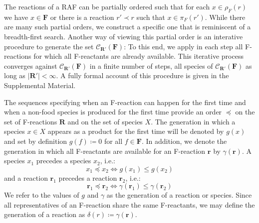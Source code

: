 \documentclass[pdflatex]{sn-jnl}
\theoremstyle{thmstyleone}%
\theoremstyle{examplesty}%
\theoremstyle{thmstylethree}%
\newcommand{\food}{\ensuremath{\mathbf{F}}}
\newcommand{\closure}[2]{\mathscr{C}_{#1}(#2)}
\newcommand{\FR}[0]{\mathbf{R}}
\newcommand{\fr}[0]{\mathbf{r}}
\newcommand{\RAF}[0]{\mathbf{R}'}
\newcommand{\sgen}{g}
\newcommand{\rgen}{\gamma}
\newcommand{\feducts}{\rho_F}
\newcommand{\fproducts}{\pi_F}
\newcommand{\PFS}[1]{\begingroup\color{cyan}#1\endgroup}
\begin{document}
\PFS{The reactions of a RAF can be partially ordered such that for each
  $x\in\feducts(r)$ we have $x\in\food$ or there is a reaction $r'\prec r$
  such that $x\in\fproducts(r')$. While there are many such partial orders,
  we construct a specific one that is reminiscent of a breadth-first
  search. Another way of viewing this partial order is an interative
  procedure to generate  the set $\closure{\RAF}{\food}$:
  To this end, we} apply in each step all F-reactions for which all
F-reactants are already available.
This iterative process converges against $\closure{\RAF}{\food}$ in a
finite number of steps, all species of $\closure{\RAF}{\food}$ as long as
$\vert \RAF\vert <\infty$. \PFS{A fully formal account of this procedure is
  given in the Supplemental Material.}

The sequences specifying when an F-reaction can happen for the first time
and when a non-food species is produced for the first time provide an order
$\preceq$ on the set of F-reactions $\FR$ and on the set of species
$X$. The generation in which a species $x\in X$ appears as a product for
the first time will be denoted by $\sgen(x)$ and set by definition
$\sgen(f)\coloneqq 0$ for all $f\in \food$. In addition, we denote the
generation in which all F-reactants are available for an F-reaction $\fr$
by $\rgen(\fr)$. A species $x_1$ precedes a species $x_2$, i.e.:
\begin{equation}
  x_1\preccurlyeq x_2 \Leftrightarrow \sgen(x_1) \leq \sgen(x_2)
\end{equation} 
and a reaction $\fr_1$ precedes a reaction $\fr_2$, i.e.: 
\begin{equation}
  \fr_1\preceq \fr_2 \Leftrightarrow \rgen(\fr_1) \leq \rgen(\fr_2)
\end{equation}
We refer to the values of $\sgen$ and $\rgen$ as the generation of a 
reaction or species. Since all representatives of an F-reaction share 
the same F-reactants, we may define the generation of a reaction as $\delta(r)\coloneqq \rgen(\fr)$.
\end{document}
